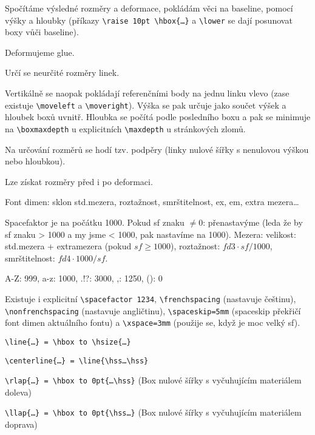 \documentclass[12pt]{article}					%
\begin{document}
    \begin{definice}
        Spočítáme výsledné rozměry a deformace, pokládám věci na baseline, pomocí výšky a hloubky (příkazy \verb|\raise 10pt \hbox{…}| a \verb|\lower| se dají posunovat boxy vůči baseline).

        Deformujeme glue.

        Určí se neurčité rozměry linek.

        Vertikálně se naopak pokládají referenčními body na jednu linku vlevo (zase existuje \verb|\moveleft| a \verb|\moveright|). Výška se pak určuje jako součet výšek a hloubek boxů uvnitř. Hloubka se počítá podle posledního boxu a pak se minimuje na \verb|\boxmaxdepth| u explicitních \verb|\maxdepth| u stránkových zlomů.

        \begin{poznamkain}
            Na určování rozměrů se hodí tzv. podpěry (linky nulové šířky s nenulovou výškou nebo hloubkou).
        \end{poznamkain}

        \begin{poznamkain}
            Lze získat rozměry před i po deformaci.
        \end{poznamkain}
    \end{definice}

    \begin{definice}
        Font dimen: sklon std.mezera, roztažnost, smrštitelnost, ex, em, extra mezera…

        Spacefaktor je na počátku 1000. Pokud sf znaku $≠ 0$: přenastavýme (leda že by sf znaku > 1000 a my jsme < 1000, pak nastavíme na 1000). Mezera: velikost: std.mezera + extramezera (pokud $sf≥1000$), roztažnost: $fd3 \cdot sf/1000$, smrštitelnost: $fd4 \cdot 1000/sf$.

        \begin{poznamka}
                A-Z: 999, a-z: 1000, .!?: 3000, ,: 1250, (): 0
        \end{poznamka}

        Existuje i explicitní \verb|\spacefactor 1234|, \verb|\frenchspacing| (nastavuje češtinu), \verb|\nonfrenchspacing| (nastavuje angličtinu), \verb|\spaceskip=5mm| (spaceskip překřičí font dimen aktuálního fontu) a \verb|\xspace=3mm| (použije se, když je moc velký sf).
    \end{definice}

    \begin{poznamka}
        \verb|\line{…} = \hbox to \hsize{…}|

        \verb|\centerline{…} = \line{\hss…\hss}|

        \verb|\rlap{…} = \hbox to 0pt{…\hss}| (Box nulové šířky s vyčuhujícím materiálem doleva)

        \verb|\llap{…} = \hbox to 0pt{\hss…}| (Box nulové šířky s vyčuhujícím materiálem doprava)
    \end{poznamka}
\end{document}
